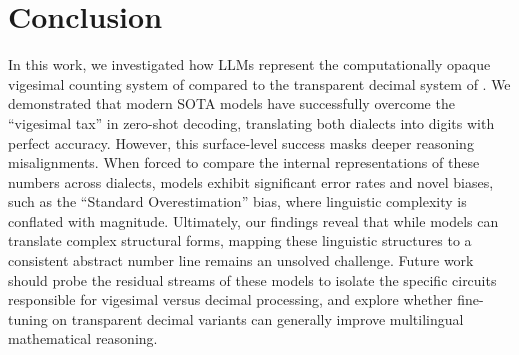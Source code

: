 \section{Conclusion}

In this work, we investigated how LLMs represent the computationally opaque vigesimal counting system of \standardfrench compared to the transparent decimal system of \swissfrench. We demonstrated that modern SOTA models have successfully overcome the ``vigesimal tax'' in zero-shot decoding, translating both dialects into digits with perfect accuracy. However, this surface-level success masks deeper reasoning misalignments. When forced to compare the internal representations of these numbers across dialects, models exhibit significant error rates and novel biases, such as the ``Standard Overestimation'' bias, where linguistic complexity is conflated with magnitude. Ultimately, our findings reveal that while models can translate complex structural forms, mapping these linguistic structures to a consistent abstract number line remains an unsolved challenge. Future work should probe the residual streams of these models to isolate the specific circuits responsible for vigesimal versus decimal processing, and explore whether fine-tuning on transparent decimal variants can generally improve multilingual mathematical reasoning.